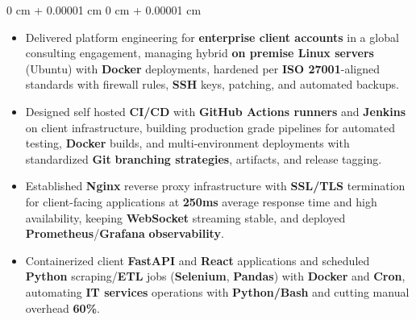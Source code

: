 \documentclass[10pt, letterpaper]{article}
\newenvironment{highlights}{
    \begin{itemize}[
        topsep=0.02 cm,
        parsep=0.02 cm,
        partopsep=0pt,
        itemsep=0pt,
        leftmargin=0 cm + 10pt
    ]
}{
    \end{itemize}
} %
\newenvironment{onecolentry}{
    \begin{adjustwidth}{
        0 cm + 0.00001 cm
    }{
        0 cm + 0.00001 cm
    }
}{
    \end{adjustwidth}
} %
\begin{document}
\begin{onecolentry}
\begin{highlights}
	\item Delivered platform engineering for \textbf{enterprise client accounts} in a global consulting engagement, managing hybrid \textbf{on premise Linux servers} (Ubuntu) with \textbf{Docker} deployments, hardened per \textbf{ISO 27001}-aligned standards with firewall rules, \textbf{SSH} keys, patching, and automated backups.
	\item Designed self hosted \textbf{CI/CD} with \textbf{GitHub Actions runners} and \textbf{Jenkins} on client infrastructure, building production grade pipelines for automated testing, \textbf{Docker} builds, and multi-environment deployments with standardized \textbf{Git} \textbf{branching strategies}, artifacts, and release tagging.
	\item Established \textbf{Nginx} reverse proxy infrastructure with \textbf{SSL/TLS} termination for client-facing applications at \textbf{250ms} average response time and high availability, keeping \textbf{WebSocket} streaming stable, and deployed \textbf{Prometheus}/\textbf{Grafana} \textbf{observability}.
	\item Containerized client \textbf{FastAPI} and \textbf{React} applications and scheduled \textbf{Python} scraping/\textbf{ETL} jobs (\textbf{Selenium}, \textbf{Pandas}) with \textbf{Docker} and \textbf{Cron}, automating \textbf{IT services} operations with \textbf{Python/Bash} and cutting manual overhead \textbf{60\%}.
\end{highlights}
\end{onecolentry}
\end{document}
